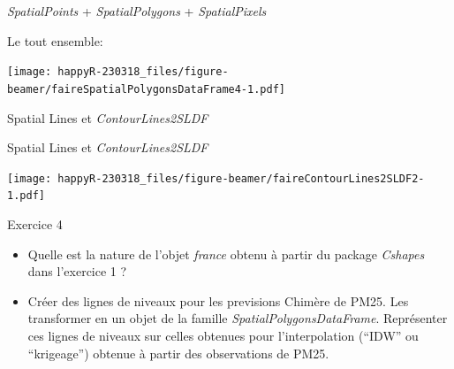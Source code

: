 \documentclass[8pt,ignorenonframetext,]{beamer}
\newenvironment{Shaded}{\begin{snugshade}}{\end{snugshade}}
\newcommand{\KeywordTok}[1]{\textcolor[rgb]{0.13,0.29,0.53}{\textbf{{#1}}}}
\newcommand{\DataTypeTok}[1]{\textcolor[rgb]{0.13,0.29,0.53}{{#1}}}
\newcommand{\DecValTok}[1]{\textcolor[rgb]{0.00,0.00,0.81}{{#1}}}
\newcommand{\StringTok}[1]{\textcolor[rgb]{0.31,0.60,0.02}{{#1}}}
\newcommand{\CommentTok}[1]{\textcolor[rgb]{0.56,0.35,0.01}{\textit{{#1}}}}
\newcommand{\NormalTok}[1]{{#1}}
\begin{document}
\begin{frame}{\emph{SpatialPoints} + \emph{SpatialPolygons} +
\emph{SpatialPixels}}

Le tout ensemble:

\texttt{[image: happyR-230318\_files/figure-beamer/faireSpatialPolygonsDataFrame4-1.pdf]}

\end{frame}

\begin{frame}[fragile]{Spatial Lines et \emph{ContourLines2SLDF}}

\begin{Shaded}
\end{Shaded}

\end{frame}

\begin{frame}{Spatial Lines et \emph{ContourLines2SLDF}}

\texttt{[image: happyR-230318\_files/figure-beamer/faireContourLines2SLDF2-1.pdf]}

\end{frame}

\begin{frame}{Exercice 4}

\begin{itemize}
\item
  Quelle est la nature de l'objet \emph{france} obtenu à partir du
  package \emph{Cshapes} dans l'exercice 1 ?
\item
  Créer des lignes de niveaux pour les previsions Chimère de PM25. Les
  transformer en un objet de la famille \emph{SpatialPolygonsDataFrame}.
  Représenter ces lignes de niveaux sur celles obtenues pour
  l'interpolation (``IDW'' ou ``krigeage'') obtenue à partir des
  observations de PM25.
\end{itemize}

\end{frame}
\end{document}
